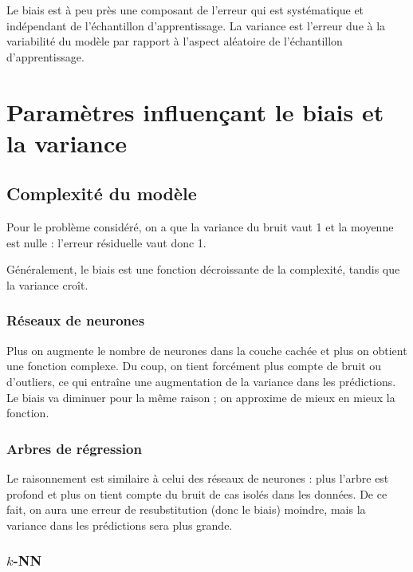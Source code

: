 	Le biais est à peu près une composant de l'erreur qui est systématique et indépendant de l'échantillon d'apprentissage. La variance est l'erreur due à la variabilité du modèle par rapport à l'aspect aléatoire de l'échantillon d'apprentissage.
	
	\section{Paramètres influençant le biais et la variance}
	
		\subsection{Complexité du modèle}
		
		Pour le problème considéré, on a que la variance du bruit vaut 1 et la moyenne est nulle : l'erreur résiduelle vaut donc 1.
		
		
		Généralement, le biais est une fonction décroissante de la complexité, tandis que la variance croît.
		
			\subsubsection{Réseaux de neurones}
		
			
			Plus on augmente le nombre de neurones dans la couche cachée et plus on obtient une fonction complexe. Du coup, on tient forcément plus compte de bruit ou d'outliers, ce qui entraîne une augmentation de la variance dans les prédictions. Le biais va diminuer pour la même raison ; on approxime de mieux en mieux la fonction.
		
			\subsubsection{Arbres de régression}
			
			
			Le raisonnement est similaire à celui des réseaux de neurones : plus l'arbre est profond et plus on tient compte du bruit de cas isolés dans les données. De ce fait, on aura une erreur de resubstitution (donc le biais) moindre, mais la variance dans les prédictions sera plus grande.
			
			\subsubsection{$k$-NN}
			
